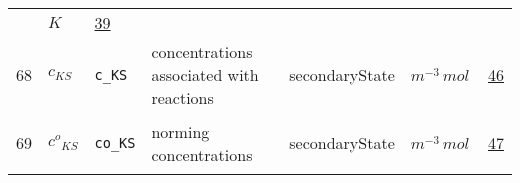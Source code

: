 \begin{longtable}{|p{1cm}|p{2.5cm}|p{4.5cm}|p{8cm}|p{3.0cm}|p{3cm}|p{1cm}|}
             & $ K \, $
             & \hyperlink{"e:39"}{ 39 }
                 \\
    68
             & \hypertarget{"v:68"}{ $ {c}{_{{K S}}} $}
             & \verb|c_KS|
             & concentrations associated with reactions
             & \begin{lay}secondaryState \end{lay}
             & $ m^{-3} \,mol \, $
             & \hyperlink{"e:46"}{ 46 }
                 \\
    69
             & \hypertarget{"v:69"}{ $ {{c^o}}{_{{K S}}} $}
             & \verb|co_KS|
             & norming concentrations
             & \begin{lay}secondaryState \end{lay}
             & $ m^{-3} \,mol \, $
             & \hyperlink{"e:47"}{ 47 }
                 \\
    \end{longtable}